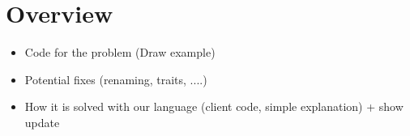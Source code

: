 \section{Overview}

\begin{itemize}
	\item Code for the problem (Draw example)
	\item Potential fixes (renaming, traits, ....)
	\item How it is solved with our language (client code, simple explanation) + show update
\end{itemize}